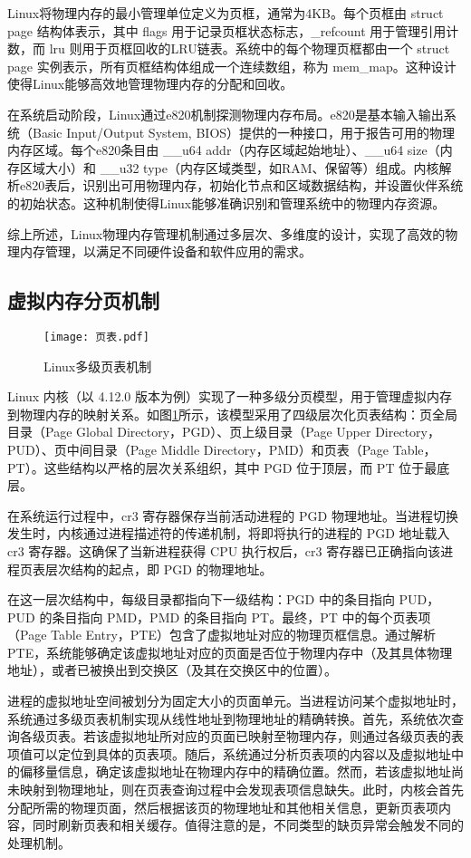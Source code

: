 Linux将物理内存的最小管理单位定义为页框，通常为4KB。每个页框由 struct page 结构体表示，其中 flags 用于记录页框状态标志，\_refcount 用于管理引用计数，而 lru 则用于页框回收的LRU链表。系统中的每个物理页框都由一个 struct page 实例表示，所有页框结构体组成一个连续数组，称为 mem\_map。这种设计使得Linux能够高效地管理物理内存的分配和回收。

在系统启动阶段，Linux通过e820机制探测物理内存布局。e820是基本输入输出系统（Basic Input/Output System, BIOS）提供的一种接口，用于报告可用的物理内存区域。每个e820条目由 \_\_u64 addr（内存区域起始地址）、\_\_u64 size（内存区域大小）和 \_\_u32 type（内存区域类型，如RAM、保留等）组成。内核解析e820表后，识别出可用物理内存，初始化节点和区域数据结构，并设置伙伴系统的初始状态。这种机制使得Linux能够准确识别和管理系统中的物理内存资源。

综上所述，Linux物理内存管理机制通过多层次、多维度的设计，实现了高效的物理内存管理，以满足不同硬件设备和软件应用的需求。

\subsection{虚拟内存分页机制}

\begin{figure}[htb]
    \centering
    \texttt{[image: 页表.pdf]}
    \caption{Linux多级页表机制}
    \label{页表}
\end{figure}

Linux 内核（以 4.12.0 版本为例）实现了一种多级分页模型，用于管理虚拟内存到物理内存的映射关系。如图\ref{页表}所示，该模型采用了四级层次化页表结构：页全局目录（Page Global Directory，PGD）、页上级目录（Page Upper Directory，PUD）、页中间目录（Page Middle Directory，PMD）和页表（Page Table，PT）。这些结构以严格的层次关系组织，其中 PGD 位于顶层，而 PT 位于最底层。

在系统运行过程中，cr3 寄存器保存当前活动进程的 PGD 物理地址。当进程切换发生时，内核通过进程描述符的传递机制，将即将执行的进程的 PGD 地址载入 cr3 寄存器。这确保了当新进程获得 CPU 执行权后，cr3 寄存器已正确指向该进程页表层次结构的起点，即 PGD 的物理地址。

在这一层次结构中，每级目录都指向下一级结构：PGD 中的条目指向 PUD，PUD 的条目指向 PMD，PMD 的条目指向 PT。最终，PT 中的每个页表项（Page Table Entry，PTE）包含了虚拟地址对应的物理页框信息。通过解析 PTE，系统能够确定该虚拟地址对应的页面是否位于物理内存中（及其具体物理地址），或者已被换出到交换区（及其在交换区中的位置）。

进程的虚拟地址空间被划分为固定大小的页面单元。当进程访问某个虚拟地址时，系统通过多级页表机制实现从线性地址到物理地址的精确转换。首先，系统依次查询各级页表。若该虚拟地址所对应的页面已映射至物理内存，则通过各级页表的表项值可以定位到具体的页表项。随后，系统通过分析页表项的内容以及虚拟地址中的偏移量信息，确定该虚拟地址在物理内存中的精确位置。然而，若该虚拟地址尚未映射到物理地址，则在页表查询过程中会发现表项信息缺失。此时，内核会首先分配所需的物理页面，然后根据该页的物理地址和其他相关信息，更新页表项内容，同时刷新页表和相关缓存。值得注意的是，不同类型的缺页异常会触发不同的处理机制。

